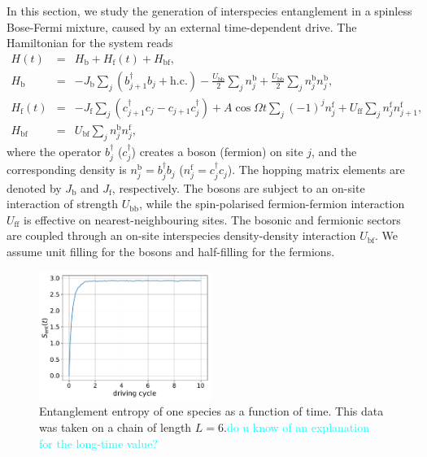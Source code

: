 \documentclass{SciPost}
\newcommand\0{\scalebox{-1}[1]{0}}
\newcommand*{\cyan}{\textcolor{cyan}}
\begin{document}
In this section, we study the generation of interspecies entanglement in a spinless Bose-Fermi mixture, caused by an external time-dependent drive. The Hamiltonian for the system reads
\begin{eqnarray}
\label{eq:H_BFM}
H(t) &=& H_\mathrm{b} + H_\mathrm{f}(t) + H_\mathrm{bf},\nonumber\\
H_\mathrm{b} &=& -J_\mathrm{b}\sum_{j}\left(b^\dagger_{j+1}b_j + \mathrm{h.c.}\right) - \frac{U_\mathrm{bb}}{2}\sum_j n^\mathrm{b}_j + \frac{U_\mathrm{bb}}{2}\sum_j n^\mathrm{b}_jn^\mathrm{b}_j,\nonumber\\
H_\mathrm{f}(t) &=& -J_\mathrm{f}\sum_{j}\left(c^\dagger_{j+1}c_j - c_{j+1}c^\dagger_j\right) + A\cos\Omega t\sum_j (-1)^j n^\mathrm{f}_j +  U_\mathrm{ff}\sum_j n^\mathrm{f}_jn^\mathrm{f}_{j+1},\nonumber\\
H_\mathrm{bf} &=& U_\mathrm{bf}\sum_j n^\mathrm{b}_jn^\mathrm{f}_j,
\end{eqnarray} 
where the operator $b^\dagger_j$ ($c^\dagger_j$) creates a boson (fermion) on site $j$, and the corresponding density is $n^\mathrm{b}_j=b^\dagger_jb_j$ ($n^\mathrm{f}_j=c^\dagger_jc_j$). The hopping matrix elements are denoted by $J_\mathrm{b}$ and $J_\mathrm{f}$, respectively. The bosons are subject to an on-site interaction of strength $U_\mathrm{bb}$, while the spin-polarised fermion-fermion interaction $U_\mathrm{ff}$ is effective on nearest-neighbouring sites. The bosonic and fermionic sectors are coupled through an on-site interspecies density-density interaction $U_\mathrm{bf}$. We assume unit filling for the bosons and half-filling for the fermions.

\begin{figure}[t!]
	\centering
	\includegraphics[width=0.5\textwidth]{BFM.pdf}
	\caption{\label{fig:BFM} Entanglement entropy of one species as a function of time. This data was taken on a chain of length $L=6$.\cyan{do u know of an explanation for the long-time value?}}
\end{figure}
\end{document}
